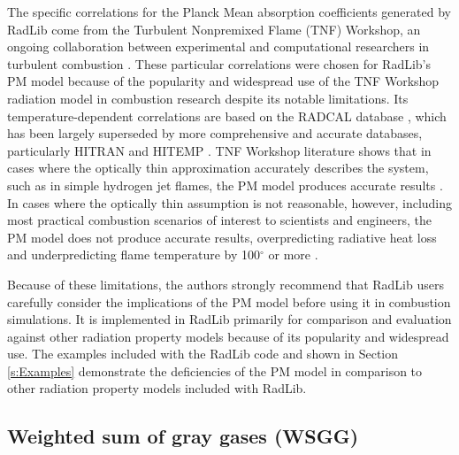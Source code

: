\documentclass[preprint,12pt]{elsarticle}
\begin{document}
The specific correlations for the Planck Mean absorption coefficients generated by RadLib come from the Turbulent Nonpremixed Flame (TNF) Workshop, an ongoing collaboration between experimental and computational researchers in turbulent combustion \citep{Smith_2003,Barlow_2001}. These particular correlations were chosen for RadLib's PM model because of the popularity and widespread use of the TNF Workshop radiation model in combustion research despite its notable limitations. Its temperature-dependent correlations are based on the RADCAL database \citep{Grosshandler_1993}, which has been largely superseded by more comprehensive and accurate databases, particularly HITRAN and HITEMP \citep{Rothman_2010}. TNF Workshop literature shows that in cases where the optically thin approximation accurately describes the system, such as in simple hydrogen jet flames, the PM model produces accurate results \citep{Barlow_1999}. In cases where the optically thin assumption is not reasonable, however, including most practical combustion scenarios of interest to scientists and engineers, the PM model does not produce accurate results, overpredicting radiative heat loss and underpredicting flame temperature by 100$^{\circ}$ or more \cite{Frank_2000,Zhu_2002,Coelho_2002}. 

Because of these limitations, the authors strongly recommend that RadLib users carefully consider the implications of the PM model before using it in combustion simulations. It is implemented in RadLib primarily for comparison and evaluation against other radiation property models because of its popularity and widespread use. The examples included with the RadLib code and shown in Section \ref{s:Examples} demonstrate the deficiencies of the PM model in comparison to other radiation property models included with RadLib.


\subsection{Weighted sum of gray gases (WSGG)} \label{s:wsgg}
\end{document}
